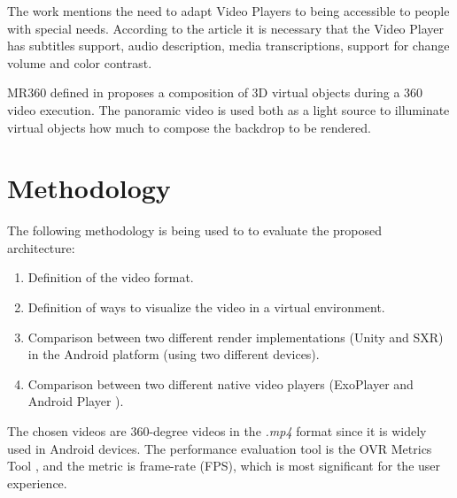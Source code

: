 \documentclass[runningheads]{llncs}
\begin{document}
The work \cite{wild2018inaccessibility} mentions the need to adapt Video Players to being accessible to people with special needs. According to the article it is necessary that the Video Player has subtitles support, audio description, media transcriptions, support for change volume and color contrast.

MR360 defined in \cite{rhee2017mr360} proposes a composition of 3D virtual objects during a 360 video execution. The panoramic video is used both as a light source to illuminate virtual objects how much to compose the backdrop to be rendered.


\section{Methodology} \label{methodology}

The following methodology is being used to to evaluate the proposed architecture:

\begin{enumerate}
    \item Definition of the video format.
    \item Definition of ways to visualize the video in a virtual environment.
    \item Comparison between two different render implementations (Unity and SXR) in the Android platform (using two different devices).
    \item Comparison between two different native video players (ExoPlayer \cite{Exo} and Android Player \cite{AndroidVideoPlayer}).
\end{enumerate}

The chosen videos are 360-degree videos in the \textit{.mp4} format since it is widely used in Android devices. The performance evaluation tool is the OVR Metrics Tool \cite{ovrmetrictool}, and the metric is frame-rate (FPS), which is most significant for the user experience.


\end{document}

